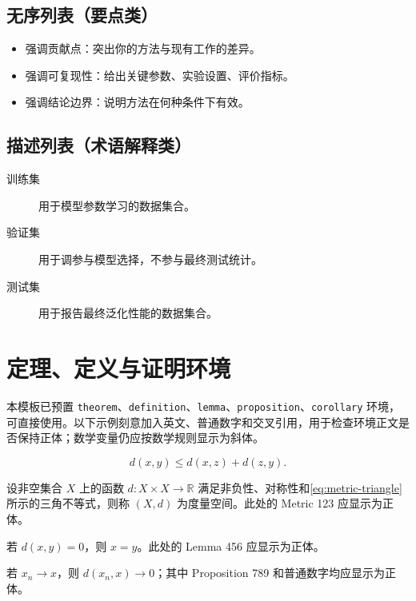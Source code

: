 \subsection{无序列表（要点类）}
\begin{itemize}
  \item 强调贡献点：突出你的方法与现有工作的差异。
  \item 强调可复现性：给出关键参数、实验设置、评价指标。
  \item 强调结论边界：说明方法在何种条件下有效。
\end{itemize}

\subsection{描述列表（术语解释类）}
\begin{description}
  \item[训练集] 用于模型参数学习的数据集合。
  \item[验证集] 用于调参与模型选择，不参与最终测试统计。
  \item[测试集] 用于报告最终泛化性能的数据集合。
\end{description}

\section{定理、定义与证明环境}

本模板已预置 \verb|theorem|、\verb|definition|、\verb|lemma|、\verb|proposition|、\verb|corollary| 环境，可直接使用。以下示例刻意加入英文、普通数字和交叉引用，用于检查环境正文是否保持正体；数学变量仍应按数学规则显示为斜体。

\begin{equation}\label{eq:metric-triangle}
  d(x,y)\le d(x,z)+d(z,y).
\end{equation}

\begin{definition}\label{def:metric-space}
设非空集合 $X$ 上的函数 $d: X\times X\to \mathbb{R}$ 满足非负性、对称性和\cref{eq:metric-triangle}所示的三角不等式，则称 $(X,d)$ 为度量空间。此处的 Metric 123 应显示为正体。
\end{definition}

\begin{lemma}\label{lem:zero-distance}
若 $d(x,y)=0$，则 $x=y$。此处的 Lemma 456 应显示为正体。
\end{lemma}

\begin{proposition}\label{prop:limit-distance}
若 $x_n\to x$，则 $d(x_n,x)\to 0$；其中 Proposition 789 和普通数字均应显示为正体。
\end{proposition}

